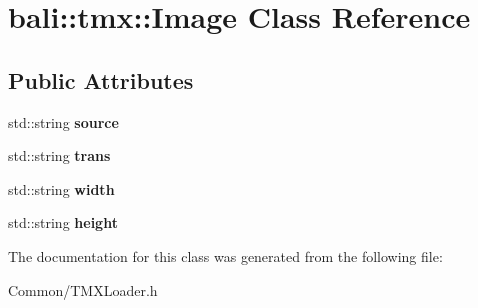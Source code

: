 \hypertarget{classbali_1_1tmx_1_1_image}{\section{bali\-:\-:tmx\-:\-:Image Class Reference}
\label{classbali_1_1tmx_1_1_image}
}
\subsection*{Public Attributes}
\begin{DoxyCompactItemize}
\item 
\hypertarget{classbali_1_1tmx_1_1_image_a0a0280d9197c6f740f6761abfd787c6e}{std\-::string {\bfseries source}}\label{classbali_1_1tmx_1_1_image_a0a0280d9197c6f740f6761abfd787c6e}

\item 
\hypertarget{classbali_1_1tmx_1_1_image_afe8f4ab37ccb9e03a38f8b3c5f914b0f}{std\-::string {\bfseries trans}}\label{classbali_1_1tmx_1_1_image_afe8f4ab37ccb9e03a38f8b3c5f914b0f}

\item 
\hypertarget{classbali_1_1tmx_1_1_image_af83cb46306e41553055324761db23129}{std\-::string {\bfseries width}}\label{classbali_1_1tmx_1_1_image_af83cb46306e41553055324761db23129}

\item 
\hypertarget{classbali_1_1tmx_1_1_image_a652a8c45434a2f49a0a6d7a3e2926647}{std\-::string {\bfseries height}}\label{classbali_1_1tmx_1_1_image_a652a8c45434a2f49a0a6d7a3e2926647}

\end{DoxyCompactItemize}


The documentation for this class was generated from the following file\-:\begin{DoxyCompactItemize}
\item 
Common/T\-M\-X\-Loader.\-h\end{DoxyCompactItemize}
